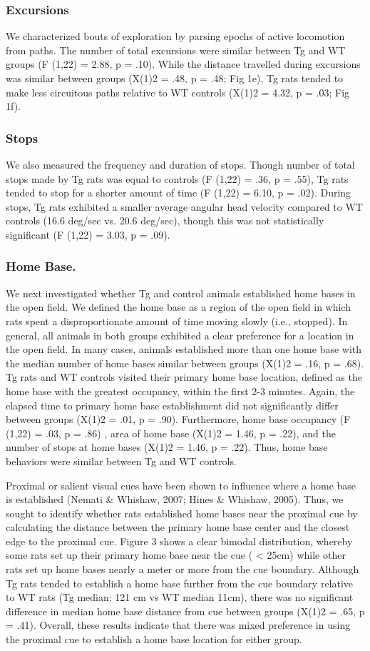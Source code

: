 \documentclass[fleqn,10pt]{wlscirep}
\begin{document}
\subsubsection*{Excursions}
We characterized bouts of exploration by parsing epochs of active locomotion from paths. The number of total excursions were similar between Tg and WT groups (F (1,22) = 2.88, p = .10). While the distance travelled during excursions was similar between groups (X(1)2 = .48, p = .48; Fig 1e), Tg rats tended to make less circuitous paths relative to WT controls (X(1)2 = 4.32, p = .03; Fig 1f).
\subsubsection*{Stops} We also measured the frequency and duration of stops. Though number of total stops made by Tg rats was equal to controls (F (1,22) = .36, p = .55), Tg rats tended to stop for a shorter amount of time (F (1,22) = 6.10, p = .02). During stops, Tg rats exhibited a smaller average angular head velocity compared to WT controls (16.6 deg/sec vs. 20.6 deg/sec), though this was not statistically significant (F (1,22) = 3.03, p = .09). 
\subsubsection*{Home Base.} We next investigated whether Tg and control animals established home bases in the open field. We defined the home base as a region of the open field in which rats spent a disproportionate amount of time moving slowly (i.e., stopped). In general, all animals in both groups exhibited a clear preference for a location in the open field. In many cases, animals established more than one home base with the median number of home bases similar between groups (X(1)2 = .16, p = .68). Tg rats and WT controls visited their primary home base location, defined as the home base with the greatest occupancy, within the first 2-3 minutes. Again, the elapsed time to primary home base establishment did not significantly differ between groups (X(1)2 = .01, p = .90). Furthermore, home base occupancy (F (1,22) = .03, p = .86) , area of home base (X(1)2 = 1.46, p = .22), and the number of stops at home bases (X(1)2 = 1.46, p = .22). Thus, home base behaviors were similar between Tg and WT controls. 

Proximal or salient visual cues have been shown to influence where a home base is established (Nemati & Whishaw, 2007; Hines & Whishaw, 2005). Thus, we sought to identify whether rats established home bases near the proximal cue by calculating the distance between the primary home base center and the closest edge to the proximal cue. Figure 3 shows a clear bimodal distribution, whereby some rats set up their primary home base near the cue ( < 25cm) while other rats set up home bases nearly a meter or more from the cue boundary. Although Tg rats tended to establish a home base further from the cue boundary relative to WT rats (Tg median: 121 cm vs WT median 11cm), there was no significant difference in median home base distance from cue between groups  (X(1)2 = .65, p = .41). Overall, these results indicate that there was mixed preference in using the proximal cue to establish a home base location for either group. 
\end{document}
